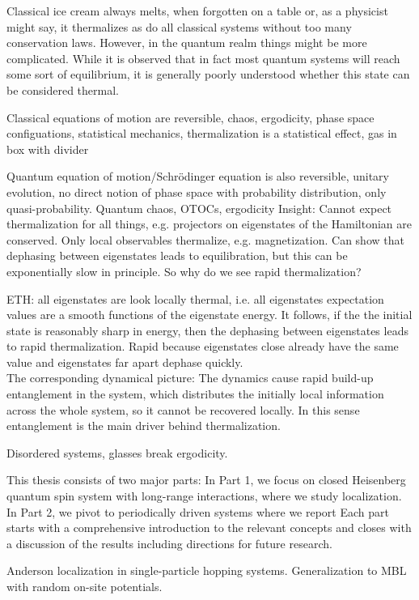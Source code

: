 \label{pt:introduction}
Classical ice cream always melts, when forgotten on a table or, as a physicist might say, it thermalizes as do all classical systems without too many conservation laws. However, in the quantum realm things might be more complicated. While it is observed that in fact most quantum systems will reach some sort of equilibrium, it is generally poorly understood whether this state can be considered thermal.  

Classical equations of motion are reversible, chaos, ergodicity, phase space configuations, statistical mechanics, thermalization is a statistical effect, gas in box with divider

Quantum equation of motion/Schrödinger equation is also reversible, unitary evolution, no direct notion of phase space with probability distribution, only quasi-probability. 
Quantum chaos, OTOCs, ergodicity
Insight: Cannot expect thermalization for all things, e.g. projectors on eigenstates of the Hamiltonian are conserved. Only local observables thermalize, e.g. magnetization.
Can show that dephasing between eigenstates leads to equilibration, but this can be exponentially slow in principle. So why do we see rapid thermalization?

ETH: all eigenstates are look locally thermal, i.e. all eigenstates expectation values are a smooth functions of the eigenstate energy. It follows, if the the initial state is reasonably sharp in energy, then the dephasing between eigenstates leads to rapid thermalization. Rapid because eigenstates close already have the same value and eigenstates far apart dephase quickly.\\
The corresponding dynamical picture: The dynamics cause rapid build-up entanglement in the system, which distributes the initially local information across the whole system, so it cannot be recovered locally. In this sense entanglement is the main driver behind thermalization.

Disordered systems, glasses break ergodicity. 

This thesis consists of two major parts: In Part 1, we focus on closed Heisenberg quantum spin system with long-range interactions, where we study localization. In Part 2, we pivot to periodically driven systems where we report 
Each part starts with a comprehensive introduction to the relevant concepts and closes with a discussion of the results including directions for future research. 

Anderson localization in single-particle hopping systems. Generalization to MBL with random on-site potentials. 

